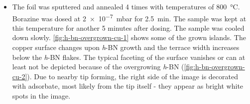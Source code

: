 % 
\begin{itemize}
 \item The foil was sputtered and annealed 4 times with temperatures of \SI{800}{\celsius}. Borazine was dosed at \SI{2e-7}{\milli \bar} for \SI{2.5}{\minute}. The sample was kept at this temperature for another 5 minutes after dosing. The sample was cooled down slowly. \autoref{fig:h-bn-overgrown-cu-1} shows some of the grown islands. The copper surface changes upon \textit{h}-BN growth and the terrace width increases below the \textit{h}-BN flakes. The typical faceting of the surface vanishes or can at least not be depicted because of the overgrowing \textit{h}-BN (\autoref{fig:h-bn-overgrown-cu-2}). Due to nearby tip forming, the right side of the image is decorated with adsorbate, most likely from the tip itself - they appear as bright white spots in the image.
\end{itemize}
